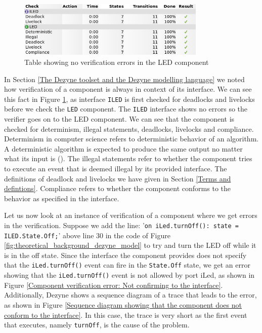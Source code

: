 \documentclass[12pt]{scrreprt}
\begin{document}
\begin{figure}
    \centering
    \includegraphics[width=0.8\textwidth]{Figures/theoretical_background/led_verification.png}
    \caption{Table showing no verification errors in the LED component}
    \label{fig:Table showing no verifcation errors in the LED component}
\end{figure}

In Section \ref{The Dezyne toolset and the Dezyne modelling language} we noted how verification of a component is always in context of its interface. We can see this fact in Figure \ref{fig:Table showing no verifcation errors in the LED component}, as interface \texttt{ILED} is first checked for deadlocks and livelocks before we check the \texttt{LED} component. The \texttt{ILED} interface shows no errors so the verifier goes on to the LED component. We can see that the component is checked for determinism, illegal statements, deadlocks, livelocks and compliance. Determinism in computer science refers to deterministic behavior of an algorithm. A deterministic algorithm is expected to produce the same output no matter what its input is (\cite{determinism}). The illegal statements refer to whether the component tries to execute an event that is deemed illegal by its provided interface. The definitions of deadlock and livelocks we have given in Section \ref{Terms and defintions}. Compliance refers to whether the component conforms to the behavior as specified in the interface.
\par
Let us now look at an instance of verification of a component where we get errors in the verification. Suppose we add the line: '\texttt{on iLed.turnOff(): state = ILED.State.Off;}' above line 30 in the code of Figure \ref{fig:theoretical_background_dezyne_model} to try and turn the LED off while it is in the off state. Since the interface the component provides does not specify that the \texttt{iLed.turnOff()} event can fire in the \texttt{State.Off} state, we get an error showing that the \texttt{iLed.turnOff()} event is not allowed by port iLed, as shown in Figure \ref{Component verification error: Not confirming to the interface}. Additionally, Dezyne shows a sequence diagram of a trace that leads to the error, as shown in Figure \ref{Sequence diagram showing that the component does not conform to the interface}. In this case, the trace is very short as the first event that executes, namely \texttt{turnOff}, is the cause of the problem.
\end{document}
